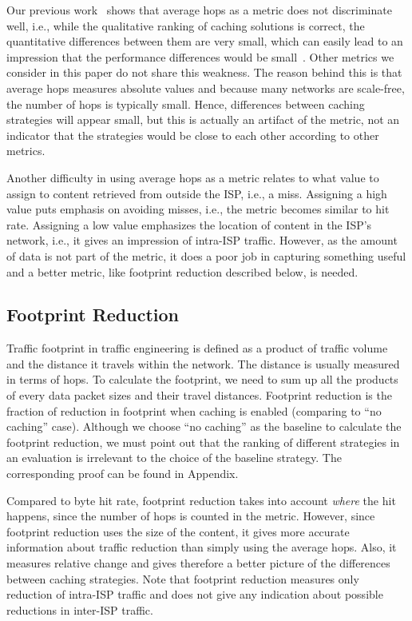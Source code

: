 \documentclass{sigcomm-alternate}
\begin{document}
Our previous work~\cite{wong:globecom2012} shows that average hops as a metric does not discriminate well, i.e., while the qualitative ranking of caching solutions is correct, the quantitative differences between them are very small, which can easily lead to an impression that the performance differences would be small~\cite{seyedicn2013}.
Other metrics we consider in this paper do not share this weakness.
The reason behind this is that average hops measures absolute values and because many networks are scale-free, the number of hops is typically small.
Hence, differences between caching strategies will appear small, but this is actually an artifact of the metric, not an indicator that the strategies would be close to each other according to other metrics.

Another difficulty in using average hops as a metric relates to what value to assign to content retrieved from outside the ISP, i.e., a miss.
Assigning a high value puts emphasis on avoiding misses, i.e., the metric becomes similar to hit rate.
Assigning a low value emphasizes the location of content in the ISP's network, i.e., it gives an impression of intra-ISP traffic.
However, as the amount of data is not part of the metric, it does a poor job in capturing something useful and a better metric, like footprint reduction described below, is needed.



\subsection{Footprint Reduction}
\label{sec:footprint-reduction}

Traffic footprint in traffic engineering is defined as a product of traffic volume and the distance it travels within the network.
The distance is usually measured in terms of hops.
To calculate the footprint, we need to sum up all the products of every data packet sizes and their travel distances.
Footprint reduction is the fraction of reduction in footprint when caching is enabled (comparing to ``no caching'' case). Although we choose ``no caching'' as the baseline to calculate the footprint reduction, we must point out that the ranking of different strategies in an evaluation is irrelevant to the choice of the baseline strategy. The corresponding proof can be found in Appendix.

Compared to byte hit rate, footprint reduction takes into account \emph{where} the hit happens, since the number of hops is counted in the metric.
However, since footprint reduction uses the size of the content, it gives more accurate information about traffic reduction than simply using the average hops.
Also, it measures relative change and gives therefore a better picture of the differences between caching strategies.
Note that footprint reduction measures only reduction of intra-ISP traffic and does not give any indication about possible reductions in inter-ISP traffic.
\end{document}
